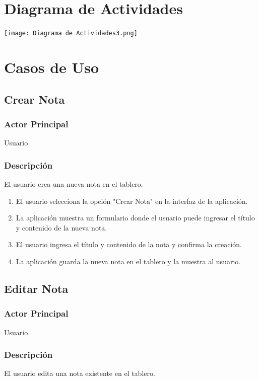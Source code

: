 \section{Diagrama de Actividades}
\begin{center}
\texttt{[image: Diagrama de Actividades3.png]}
\end{center}

\section{Casos de Uso}
\subsection{Crear Nota}
\subsubsection{Actor Principal}
Usuario

\subsubsection{Descripción}
El usuario crea una nueva nota en el tablero.

\begin{enumerate}
  \item El usuario selecciona la opción "Crear Nota" en la interfaz de la aplicación.
  \item La aplicación muestra un formulario donde el usuario puede ingresar el título y contenido de la nueva nota.
  \item El usuario ingresa el título y contenido de la nota y confirma la creación.
  \item La aplicación guarda la nueva nota en el tablero y la muestra al usuario.
\end{enumerate}

\subsection{Editar Nota}
\subsubsection{Actor Principal}
Usuario

\subsubsection{Descripción}
El usuario edita una nota existente en el tablero.

